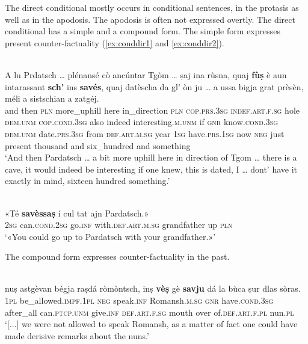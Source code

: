 The direct conditional mostly occurs in conditional sentences, in the protasis as well as in the apodosis. The apodosis is often not expressed overtly. The direct conditional has a simple and a compound form. The simple form expresses present counter-factuality (\ref{ex:conddir1} and \ref{ex:conddir2}).

\ea\label{ex:conddir1}
\\
\gll A lu Prdatsch … plénansé cò ancúntar Tgòm … ṣaj ina rùsna, quaj \textbf{fùṣ} è aun intarassant \textbf{sch’} ins \textbf{savés}, quaj datèscha da gl' òn ju … a ussa bigja grat prèsèn, méli a sistschian a zatgéj.\\
and then \textsc{pln} {} more\_uphill here in\_direction \textsc{pln} {} \textsc{cop.prs.3sg} \textsc{indef.art.f.sg} hole \textsc{dem.unm} \textsc{cop.cond.3sg} also indeed interesting.\textsc{m.unm} if \textsc{gnr} know.\textsc{cond.3sg} \textsc{dem.unm} date.\textsc{prs.3sg} from \textsc{def.art.m.sg} year \textsc{1sg} {} have.\textsc{prs.1sg} now \textsc{neg} just present thousand and six\_hundred and something\\
\glt `And then Pardatsch … a bit more uphill here in direction of Tgom … there is a cave, it would indeed be interesting if one knew, this is dated, I … dont' have it exactly in mind, sixteen hundred something.'
\z

\ea
\label{ex:conddir2}
\\
\gll  «Té \textbf{savèssaṣ} í cul tat ajn Pardatsch.»  \\
\textsc{2sg} can.\textsc{cond.2sg} go.\textsc{inf} with.\textsc{def.art.m.sg} grandfather up \textsc{pln}\\
\glt `«You could go up to Pardatsch with your grandfather.»'
\z

The compound form expresses counter-factuality in the past.

\ea
\label{ex:conddir3}
\\
\gll   [...] nuṣ astgèvan bégja raṣdá ròmòntsch, inṣ \textbf{vèṣ} gè \textbf{savju} dá la bùca ṣur dlas sòras.\\
{} \textsc{1pl} be\_allowed.\textsc{impf.1pl} \textsc{neg} speak.\textsc{inf} Romansh.\textsc{m.sg} \textsc{gnr}  have.\textsc{cond.3sg} after\_all can.\textsc{ptcp.unm} give.\textsc{inf} \textsc{def.art.f.sg} mouth over of.\textsc{def.art.f.pl} nun.\textsc{pl}\\
\glt `[...] we were not allowed to speak Romansh, as a matter of fact one could have made derisive remarks about the nuns.'
\z

